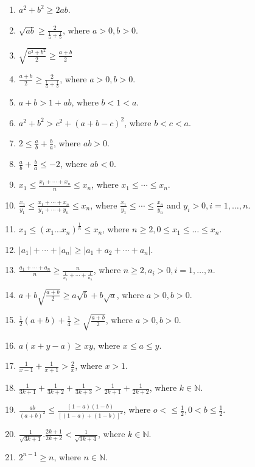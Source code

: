 \begin{enumerate}
\item $a^2 + b^2 \geq 2ab$.
\item $\sqrt{ab}\geq \frac{2}{\frac{1}{a} + \frac{1}{b}}$, where $a>0, b>0$.
\item $\sqrt{\frac{a^2 + b^2}{2}}\geq \frac{a + b}{2}$
\item $\frac{a + b}{2}\geq \frac{2}{\frac{1}{a} + \frac{1}{b}}$, where $a>0, b>0$.
\item $a + b > 1 + ab$, where $b < 1 < a$.
\item $a^2 + b^2 > c^2 + (a + b - c)^2$, where $b < c< a$.
\item $2\leq \frac{a}{b} + \frac{b}{a}$, where $ab > 0$.
\item $\frac{a}{b} + \frac{b}{a}\leq -2$, where $ab < 0$.
\item $x_1\leq \frac{x_1 + \cdots + x_n}{n}\leq x_n$, where $x_1\leq \cdots\leq x_n$.
\item $\frac{x_1}{y_1}\leq \frac{x_1 + \cdots + x_n}{y_1 + \cdots + y_n}\leq x_n$, where $\frac{x_1}{y_1}\leq\cdots\leq
  \frac{x_n}{y_n}$ and $y_i> 0, i=1, \ldots, n$.
\item $x_1\leq(x_1\ldots x_n)^{\tfrac{1}{n}}\leq x_n$, where $n\geq 2, 0\leq x_1\leq\ldots\leq x_n$.
\item $|a_1| + \cdots + |a_n|\geq |a_1 + a_2 + \cdots + a_n|$.
\item $\frac{a_1 + \cdots + a_n}{n}\geq \frac{n}{\frac{1}{a_1} + \cdots + \frac{1}{a_n}}$, where $n\geq 2, a_i> 0, i=1, \ldots, n$.
\item $a + b\sqrt{\frac{a + b}{2}} \geq a\sqrt{b} + b\sqrt{a}$, where $a > 0, b > 0$.
\item $\frac{1}{2}(a + b) + \frac{1}{4}\geq \sqrt{\frac{a + b}{2}}$, where $a > 0, b > 0$.
\item $a(x + y - a)\geq xy$, where $x\leq a\leq y$.
\item $\frac{1}{x - 1} + \frac{1}{x + 1} > \frac{2}{x}$, where $x > 1$.
\item $\frac{1}{3k + 1} + \frac{1}{3k + 2} + \frac{1}{3k + 3} > \frac{1}{2k + 1} + \frac{1}{2k + 2}$, where $k\in\mathbb{N}$.
\item $\frac{ab}{(a + b)^2}\leq \frac{(1 - a)(1 - b)}{[(1 - a) + (1 - b)]^2}$, where $o<\leq\frac{1}{2}, 0<b\leq\frac{1}{2}$.
\item $\frac{1}{\sqrt{3k + 1}}.\frac{2k + 1}{2k + 2} < \frac{1}{\sqrt{3k + 4}}$, where $k\in\mathbb{N}$.
\item $2^{n - 1}\geq n$, where $n\in\mathbb{N}$.

\end{enumerate}
